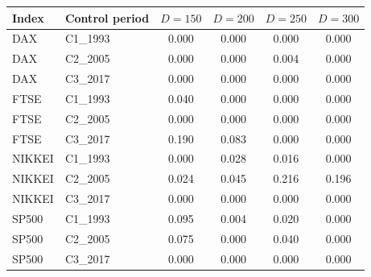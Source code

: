 \begin{tabular}{llcccc}
\toprule
Index & Control period & $D = 150$ & $D = 200$ & $D = 250$ & $D = 300$ \\
\midrule
DAX & C1\_1993 & 0.000 & 0.000 & 0.000 & 0.000 \\
DAX & C2\_2005 & 0.000 & 0.000 & 0.004 & 0.000 \\
DAX & C3\_2017 & 0.000 & 0.000 & 0.000 & 0.000 \\
\addlinespace
FTSE & C1\_1993 & 0.040 & 0.000 & 0.000 & 0.000 \\
FTSE & C2\_2005 & 0.000 & 0.000 & 0.000 & 0.000 \\
FTSE & C3\_2017 & 0.190 & 0.083 & 0.000 & 0.000 \\
\addlinespace
NIKKEI & C1\_1993 & 0.000 & 0.028 & 0.016 & 0.000 \\
NIKKEI & C2\_2005 & 0.024 & 0.045 & 0.216 & 0.196 \\
NIKKEI & C3\_2017 & 0.000 & 0.000 & 0.000 & 0.000 \\
\addlinespace
SP500 & C1\_1993 & 0.095 & 0.004 & 0.020 & 0.000 \\
SP500 & C2\_2005 & 0.075 & 0.000 & 0.040 & 0.000 \\
SP500 & C3\_2017 & 0.000 & 0.000 & 0.000 & 0.000 \\
\bottomrule
\end{tabular}
